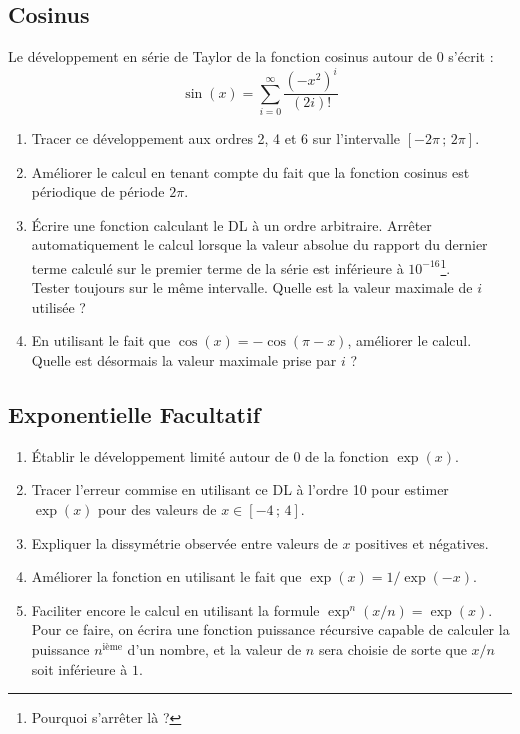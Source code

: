 \subsection{Cosinus}
Le développement en  série de Taylor de la fonction  cosinus autour de
$0$ s'écrit :
\begin{equation}
\sin(x) = \sum_{i=0}^\infty \frac{(-x^{2})^i}{(2i)!}
\end{equation}
\begin{enumerate}
\item Tracer ce  développement aux ordres 2, 4 et  6 sur l'intervalle
  $[-2\pi\,;\,2\pi]$.
\item Améliorer  le calcul en  tenant compte  du fait que  la fonction
  cosinus est périodique de période $2\pi$.
\item  Écrire une  fonction calculant  le  DL à  un ordre  arbitraire.
  Arrêter  automatiquement  le calcul  lorsque  la  valeur absolue  du
  rapport du  dernier terme calculé sur  le premier terme de  la série
  est  inférieure   à  $10^{-16}$\footnote{Pourquoi s'arrêter là ?}.\\  Tester  toujours   sur  le  même
  intervalle. Quelle est la valeur maximale de $i$ utilisée ?
\item En utilisant le fait  que $\cos(x) = -\cos(\pi-x)$, améliorer le
  calcul. Quelle est désormais la valeur maximale prise par $i$ ?
 \end{enumerate}


\subsection{Exponentielle {\sc Facultatif}}
\begin{enumerate}
\item  Établir le  développement limité  autour  de 0  de la  fonction
  $\exp(x)$.
\item Tracer  l'erreur commise en  utilisant ce  DL à l'ordre  10 pour
  estimer $\exp(x)$ pour des valeurs de $x \in [-4\,;\,4]$.
\item Expliquer la dissymétrie observée entre valeurs de $x$ positives
  et négatives.
\item  Améliorer la  fonction  en  utilisant le  fait  que $\exp(x)  =
  1/\exp(-x)$.
\item Faciliter encore le calcul  en utilisant la formule $\exp^n(x/n)
  =  \exp(x)$.   Pour  ce  faire, on  écrira  une  fonction  puissance
  récursive   capable  de  calculer   la  puissance
  $n^\textrm{ième}$ d'un nombre,  et la valeur de $n$  sera choisie de
  sorte que $x/n$ soit inférieure à $1$.\\

\end{enumerate}

